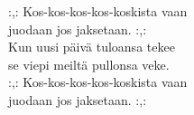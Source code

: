 
            :,: Kos-kos-kos-kos-koskista vaan \\
            juodaan jos jaksetaan. :,: \\
            Kun uusi päivä tuloansa tekee \\
            se viepi meiltä pullonsa veke. \\
            :,: Kos-kos-kos-kos-koskista vaan \\
            juodaan jos jaksetaan. :,: \\
